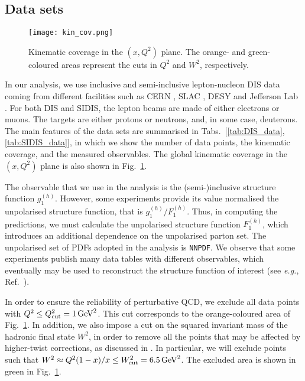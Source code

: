 \subsection*{Data sets}
\begin{figure}[t]
  \centering
  \texttt{[image: kin\_cov.png]} 
  \caption{\small{Kinematic coverage in the $(x,Q^2)$ plane. The orange- and green-coloured areas represent the cuts in $Q^2$ and $W^2$, respectively.}}
  \label{fig:kin_cov}
\end{figure}
In our analysis, we use inclusive and semi-inclusive lepton-nucleon DIS data coming from different facilities such as CERN \cite{EuropeanMuon:1989yki, SpinMuon:1999udj, COMPASS:2006mhr, COMPASS:2010wkz, COMPASS:2010hwr}, SLAC \cite{E142:1993hql, E143:1998hbs, E154:1997xfa, E155:2000qdr}, DESY \cite{HERMES:2018awh, HERMES:2006jyl, HERMES:1997hjr} and Jefferson Lab \cite{Kramer:2002tt, JeffersonLabHallA:2004tea, CLAS:2014qtg}. For both DIS and SIDIS, the lepton beams are made of either electrons or muons. The targets are either protons or neutrons, and, in some case, deuterons. The main features of the data sets are summarised in Tabs.~[\ref{tab:DIS_data}, \ref{tab:SIDIS_data}], in which we show the number of data points, the kinematic coverage, and the measured observables. The global kinematic coverage in the $(x,Q^2)$ plane is also shown in Fig.~\ref{fig:kin_cov}. \par
The observable that we use in the analysis is the (semi-)inclusive structure function $g_1^{(h)}$. However, some experiments provide its value normalised the unpolarised structure function, that is $g_1^{(h)}/F_1^{(h)}$. Thus, in computing the predictions, we must calculate the unpolarised structure function $F_1^{(h)}$, which introduces an additional dependence on the unpolarised parton set. The unpolarised set of PDFs adopted in the analysis is \texttt{NNPDF}. We observe that some experiments publish many data tables with different observables, which eventually may be used to reconstruct the structure function of interest (see \textit{e.g.}, Ref.~\cite{Nocera:2014vla}).\par
In order to ensure the reliability of perturbative QCD, we exclude all data points with $Q^2 \leq Q^2_{\textrm{cut}} = 1 \, \textrm{GeV}^2$. This cut corresponds to the orange-coloured area of Fig.~\ref{fig:kin_cov}. In addition, we also impose a cut on the squared invariant mass of the hadronic final state $W^2$, in order to remove all the points that may be affected by higher-twist corrections, as discussed in . In particular, we will exclude points such that $W^2 \approx Q^2 (1-x)/x \leq W^2_{\textrm{cut}} = 6.5 \, \textrm{GeV}^2$. The excluded area  is shown in green in Fig.~\ref{fig:kin_cov}.\par

